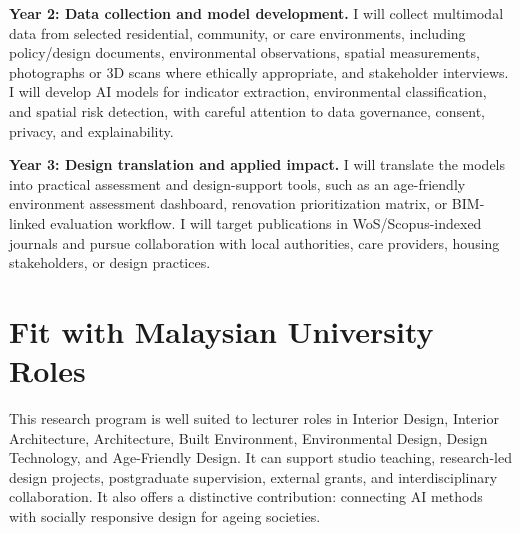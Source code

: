 \documentclass[11pt,a4paper]{article}
\begin{document}
\textbf{Year 2: Data collection and model development.} I will collect multimodal data from selected residential, community, or care environments, including policy/design documents, environmental observations, spatial measurements, photographs or 3D scans where ethically appropriate, and stakeholder interviews. I will develop AI models for indicator extraction, environmental classification, and spatial risk detection, with careful attention to data governance, consent, privacy, and explainability.

\textbf{Year 3: Design translation and applied impact.} I will translate the models into practical assessment and design-support tools, such as an age-friendly environment assessment dashboard, renovation prioritization matrix, or BIM-linked evaluation workflow. I will target publications in WoS/Scopus-indexed journals and pursue collaboration with local authorities, care providers, housing stakeholders, or design practices.

\section*{Fit with Malaysian University Roles}
This research program is well suited to lecturer roles in Interior Design, Interior Architecture, Architecture, Built Environment, Environmental Design, Design Technology, and Age-Friendly Design. It can support studio teaching, research-led design projects, postgraduate supervision, external grants, and interdisciplinary collaboration. It also offers a distinctive contribution: connecting AI methods with socially responsive design for ageing societies.
\end{document}

